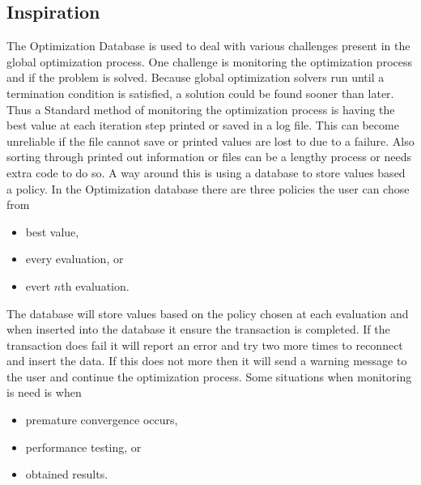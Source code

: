 \subsection{Inspiration}
The Optimization Database is used to deal with various challenges present in the global optimization process. One challenge is monitoring the optimization process and if the problem is solved. Because global optimization solvers run until a termination condition is satisfied, a solution could be found sooner than later. Thus a Standard method of monitoring the optimization process is having the best value at each iteration step printed or saved in a log file. This can become
unreliable if the file cannot save or printed values are lost to due to a failure. Also sorting through printed out information or files can be a lengthy process or needs extra code to do so. A way around this is using a database to store values based a policy. In the Optimization database there
are three policies the user can chose from
\begin{itemize}
    \item best value, 
    \item every evaluation, or
    \item evert $n$th evaluation.
\end{itemize}
The database will store values based on the policy chosen at each evaluation and when inserted into the database it ensure the transaction is completed. If the transaction does fail it will report an error and try two more times to reconnect and insert the data. If this does not more then it will send a warning message to the user and continue the optimization process. 
Some situations when monitoring is need is when 
\begin{itemize}
    \item premature convergence occurs, 
    \item performance testing, or
    \item obtained results.
\end{itemize}

